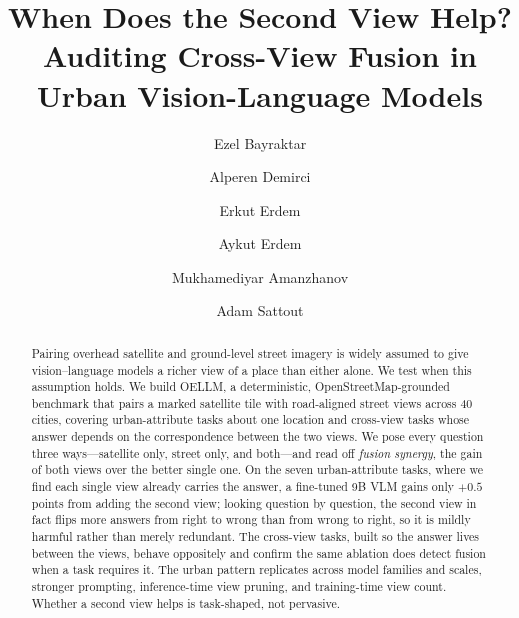 \documentclass[runningheads]{llncs}
\begin{document}
\title{When Does the Second View Help? Auditing Cross-View Fusion in Urban Vision-Language Models}


\author{Ezel Bayraktar \and
Alperen Demirci \and
Erkut Erdem \and
Aykut Erdem \and
Mukhamediyar Amanzhanov \and
Adam Sattout}

\maketitle

\begin{abstract}
Pairing overhead satellite and ground-level street imagery is widely assumed to give
vision--language models a richer view of a place than either alone. We test when this
assumption holds. We build OELLM, a deterministic, OpenStreetMap-grounded benchmark
that pairs a marked satellite tile with road-aligned street views across \num{40}
cities, covering urban-attribute tasks about one location and cross-view tasks whose
answer depends on the correspondence between the two views. We pose every question
three ways---satellite only, street only, and both---and read off \emph{fusion
synergy}, the gain of both views over the better single one. On the seven
urban-attribute tasks, where we find each single view already carries the answer, a
fine-tuned 9B VLM gains only $+\num{0.5}$ points from adding the second view; looking
question by question, the second view in fact flips more answers from right to wrong
than from wrong to right, so it is mildly harmful rather than merely redundant. The
cross-view tasks, built so the answer lives between the views, behave oppositely and
confirm the same ablation does detect fusion when a task requires it. The urban
pattern replicates across model families and scales, stronger prompting,
inference-time view pruning, and training-time view count. Whether a second view helps
is task-shaped, not pervasive.
\end{abstract}
\end{document}
